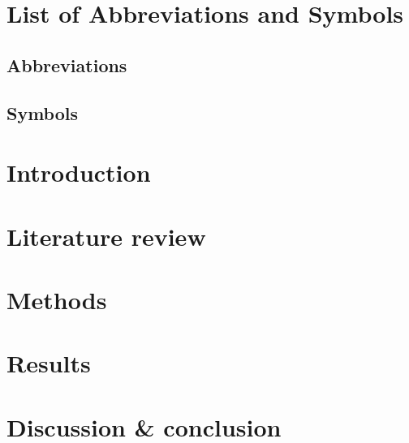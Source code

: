 \documentclass[a4paper,master=mai,masteroption=ecs,english]{kulemt}
\begin{document}
\begin{preface}

\end{preface}
\tableofcontents*
\begin{abstract}

\end{abstract}
\listoffiguresandtables
\chapter{List of Abbreviations and Symbols}
\section*{Abbreviations}

\section*{Symbols}
\mainmatter
\chapter{Introduction}

\chapter{Literature review}

\chapter{Methods}

\chapter{Results}

\chapter{Discussion \& conclusion}

\appendixpage*
\appendix


\backmatter


\end{document}
